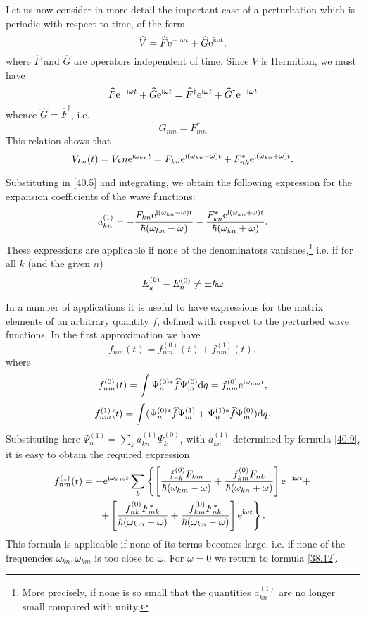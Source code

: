 Let us now consider in more detail the important case of a perturbation which is periodic with respect to time, of the form
\begin{equation}\label{40.6}
\widehat{V}=\widehat{F}\mathrm{e}^{-\mathrm{i}\omega t}+\widehat{G}\mathrm{e}^{\mathrm{i}\omega t},
\end{equation}
where $\hat{F}$ and $ \hat{G} $ are operators independent of time. Since $ V $ is Hermitian, we must have
\[ \widehat{F}\mathrm{e}^{-\mathrm{i}\omega t}+\widehat{G}\mathrm{e}^{\mathrm{i}\omega t}=\widehat{F}^{\dagger}\mathrm{e}^{\mathrm{i}\omega t}+\widehat{G}^{\dagger}\mathrm{e}^{-\mathrm{i}\omega t}
 \]
whence $ \hat{G}=\hat{F}^\dagger $, i.e.
\begin{equation}\label{40.7}
G_{nm}=F_{mn}^*
\end{equation}
This relation shows that
\begin{equation}\label{40.8}
V_{kn}(t)=V_kn\mathrm{e}^{\mathrm{i}\omega_{kn}t}=F_{kn}\mathrm{e}^{\mathrm{i}(\omega_{kn}-\omega)t}+F_{nk}^*\mathrm{e}^{\mathrm{i}(\omega_{kn}+\omega)t}.
\end{equation}


Substituting in \eqref{40.5} and integrating, we obtain the following expression for the expansion coefficients of the wave functions:
\begin{equation}\label{40.9}
a_{kn}^{(1)}=-\frac{F_{kn}\mathrm{e}^{\mathrm{i}(\omega_{kn}-\omega)t}}{\hbar(\omega_{kn}-\omega)}-\frac{F_{kn}^*\mathrm{e}^{\mathrm{i}(\omega_{kn}+\omega)t}}{\hbar(\omega_{kn}+\omega)}.
\end{equation}
These expressions are applicable if none of the denominators vanishes,\footnote{More precisely, if none is so small that the quantities $ a_{kn}^{(1)} $ are no longer small compared with unity.
} i.e. if for all $ k $ (and the given $ n $)
\begin{equation}\label{40.10}
E_k^{(0)}-E_n^{(0)}\ne\pm\hbar\omega
\end{equation}


In a number of applications it is useful to have expressions for the matrix elements of an arbitrary quantity $ f $, defined with respect to the perturbed wave functions. In the first approximation we have
\[ f_{nm}(t)=f_{nm}^{(0)}(t)+f_{nm}^{(1)}(t), \]
where
\[ f_{nm}^{(0)}(t)=\int\Psi_n^{(0)*}\widehat{f}\Psi_m^{(0)}\mathrm{d} q=f_{nm}^{(0)}\mathrm{e}^{\mathrm{i}\omega_{nm}t}, \]
\[ f_{nm}^{(1)}(t)=\int(\Psi_n^{(0)*}\widehat{f}\Psi_m^{(1)}+\Psi_n^{(1)*}\widehat{f}\Psi_m^{(0)})\mathrm{d} q. \]
Substituting here $ \Psi_n^{(1)} =\sum_k a_{kn}^{(1)}\Psi_k^{(0)} $, with $ a_{kn}^{(1)} $ determined by formula \eqref{40.9}, it is easy to obtain the required expression
\begin{multline}\label{40.11}
f_{nm}^{(1)}(t)=-\mathrm{e}^{\mathrm{i}\omega_{nm}t}\sum_k\left\{\left[\frac{f_{nk}^{(0)}F_{km}}{\hbar(\omega_{km}-\omega)}+\frac{f_{km}^{(0)}F_{nk}}{\hbar(\omega_{kn}+\omega)} \right]\mathrm{e}^{-\mathrm{i}\omega t}+\right.\\
\left.+\left[\frac{f_{nk}^{(0)}F_{mk}^*}{\hbar(\omega_{km}+\omega)}+\frac{f_{km}^{(0)}F_{nk}^*}{\hbar(\omega_{kn}-\omega)}\right]\mathrm{e}^{\mathrm{i}\omega t}  \right\}.
\end{multline}
This formula is applicable if none of its terms becomes large, i.e. if none of the frequencies $ \omega_{kn}, \omega_{km} $ is too close to $\omega$. For $ \omega = 0 $ we return to formula \eqref{38.12}.

